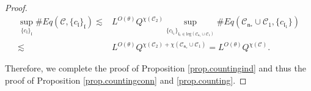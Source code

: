 \begin{proof}
    \begin{equation}
    \begin{split}
     \sup_{\{c_{\mathfrak{l}}\}_{\mathfrak{l}}}\#Eq(\mathcal{C},\{c_{\mathfrak{l}}\}_{\mathfrak{l}})
     \lesssim& L^{O(\theta)} Q^{\chi(\mathcal{C}_2)}\sup_{\{c_{\mathfrak{l}_1}\}_{\mathfrak{l}_1\in \text{leg}(\mathcal{C}_{\mathfrak{n}_*}\cup \mathcal{C}_1)} } \# Eq(\mathcal{C}_{\mathfrak{n}_*}\cup \mathcal{C}_1,\{c_{\mathfrak{l}_1}\})
     \\
     \lesssim& L^{O(\theta)} Q^{\chi(\mathcal{C}_2)+\chi(\mathcal{C}_{\mathfrak{n}_*}\cup \mathcal{C}_1)}=L^{O(\theta)} Q^{\chi(\mathcal{C})}.
    \end{split}
    \end{equation}
    
    Therefore, we complete the proof of Proposition \ref{prop.countingind} and thus the proof of Proposition \ref{prop.countingconn} and \ref{prop.counting}.
    
    \end{proof}










